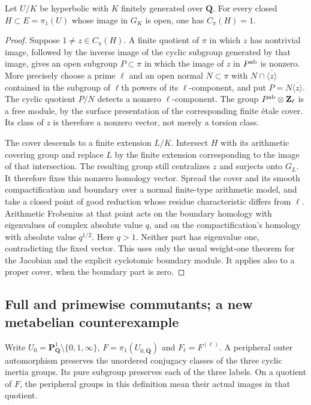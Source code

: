 \begin{lemma}
\label{A:geometric-centralizer}
Let $U/K$ be hyperbolic with $K$ finitely generated over
$\mathbf Q$.  For every closed $H\subset E=\pi_1(U)$ whose image
in $G_K$ is open, one has $C_\pi(H)=1$.
\end{lemma}
\begin{proof}
Suppose $1\ne z\in C_\pi(H)$.  A finite quotient of $\pi$ in
which $z$ has nontrivial image, followed by the inverse image of the
cyclic subgroup generated by that image, gives an open subgroup
$P\subset\pi$ in which the image of $z$ in $P^{\rm ab}$ is
nonzero.  More precisely choose a prime $\ell$ and an open normal
$N\subset\pi$ with $N\cap\overline{\langle z\rangle}$ contained
in the subgroup of $\ell$th powers of its $\ell$-component, and put
$P=N\overline{\langle z\rangle}$.  The cyclic quotient $P/N$
detects a nonzero $\ell$-component.  The group $P^{\rm ab}\otimes
\mathbf Z_\ell$ is a free module, by the surface presentation of
the corresponding finite \'etale cover.  Its class of $z$ is
therefore a nonzero vector, not merely a torsion class.

The cover descends to a finite extension $L/K$.  Intersect $H$ with
its arithmetic covering group and replace $L$ by the finite
extension corresponding to the image of that intersection.  The
resulting group still centralizes $z$ and surjects onto $G_L$.
It therefore fixes this nonzero homology vector.  Spread the cover
and its smooth compactification and boundary over a normal
finite-type arithmetic model, and take a closed point of good
reduction whose residue characteristic differs from $\ell$.
Arithmetic Frobenius at that point acts on the boundary homology
with eigenvalues of complex absolute value $q$, and on the
compactification's homology with absolute value $q^{1/2}$.
Here $q>1$.  Neither part has eigenvalue one, contradicting the
fixed vector.  This uses only the usual weight-one theorem for the
Jacobian and the explicit cyclotomic boundary module.  It applies
also to a proper cover, when the boundary part is zero.
\end{proof}

\subsection{Full and primewise commutants; a new metabelian counterexample}

Write $U_0=\mathbf P^1_{\mathbf Q}\setminus\{0,1,\infty\}$,
$F=\pi_1(U_{0,\overline{\mathbf Q}})$ and
$F_\ell=F^{(\ell)}$.  A peripheral outer automorphism preserves
the unordered conjugacy classes of the three cyclic inertia groups.
Its pure subgroup preserves each of the three labels.  On a quotient
of $F$, the peripheral groups in this definition mean their actual
images in that quotient.


